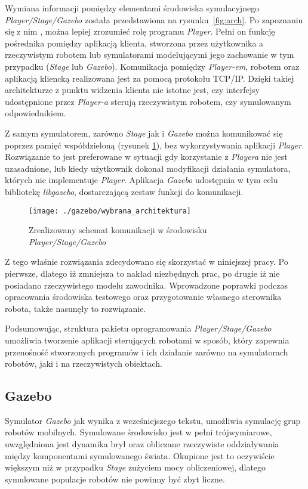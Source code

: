 	Wymiana informacji pomiędzy elementami środowiska symulacyjnego \textit{Player/Stage/Gazebo} została przedstawiona na 
	rysunku~\ref{fig:arch}.
	Po zapoznaniu się z nim , można lepiej zrozumieć rolę programu \textit{Player}. Pełni on funkcję pośrednika pomiędzy aplikacją klienta, stworzona przez użytkownika
	a rzeczywistym robotem lub symulatorami modelującymi jego zachowanie w tym przypadku (\textit{Stage} lub \textit{Gazebo}). 
	Komunikacja pomiędzy \textit{Player-em}, robotem oraz aplikacją kliencką realizowana jest za pomocą protokołu TCP/IP.
	Dzięki takiej architekturze z punktu widzenia klienta nie istotne jest, czy interfejsy udostępnione przez \textit{Player-a} sterują rzeczywistym robotem, czy symulowanym odpowiednikiem.
	
	Z samym symulatorem, zarówno \textit{Stage} jak i \textit{Gazebo} można komunikować się poprzez pamięć współdzieloną (rysunek \ref{fig:wybrana_arch}), bez wykorzystywania aplikacji \textit{Player}. Rozwiązanie to jest 
	preferowane w sytuacji gdy korzystanie z \textit{Playera} nie jest uzasadnione, lub kiedy użytkownik dokonał modyfikacji działania symulatora, których nie implementuje \textit{Player}. 
	Aplikacja \textit{Gazebo} udostępnia w tym celu  bibliotekę \textit{libgazebo}, dostarczającą zestaw funkcji do komunikacji.
	\begin{figure}[h]
	\centering
	\texttt{[image: ./gazebo/wybrana\_architektura]}
	\caption{Zrealizowany schemat komunikacji w środowisku \textit{Player/Stage/Gazebo} \label{fig:wybrana_arch}}
	\end{figure}
	Z tego właśnie rozwiązania zdecydowano się skorzystać w niniejszej pracy. Po pierwsze, dlatego iż zmniejsza to nakład niezbędnych prac, po drugie iż nie posiadano rzeczywistego modelu
	zawodnika. Wprowadzone poprawki podczas opracowania środowiska testowego oraz przygotowanie własnego sterownika robota, także nasunęły to rozwiązanie.

	Podsumowując, struktura pakietu oprogramowania \mbox{\textit{Player/Stage/Gazebo}} umożliwia tworzenie aplikacji sterujących robotami w sposób,
	który zapewnia przenośność stworzonych programów i ich działanie zarówno na symulatorach robotów, jaki i na rzeczywistych obiektach.
	
 	\subsection{Gazebo}
 	
 	Symulator \textit{Gazebo} jak wynika z wcześniejszego tekstu, umożliwia symulację grup robotów mobilnych. Symulowane
 	środowisko jest w pełni trójwymiarowe, uwzględniona jest dynamika brył oraz obliczane rzeczywiste oddziaływania między komponentami symulowanego świata.
	Okupione jest to oczywiście większym niż w przypadku \textit{Stage} zużyciem mocy obliczeniowej, dlatego symulowane populacje robotów nie powinny być zbyt liczne.
 	 	
